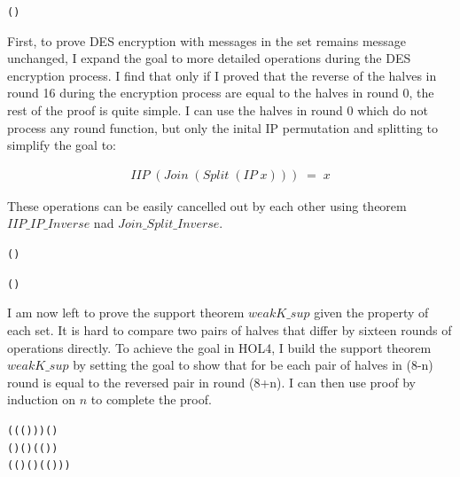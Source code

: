 \documentclass{article}
\begin{document}
\begin{alltt}
   \HOLTokenTurnstile{}  \HOLSymConst{\HOLTokenIn{}}  \HOLSymConst{\HOLTokenConj{}}   \HOLSymConst{=} (\HOLSymConst{,}) \HOLSymConst{\HOLTokenImp{}}
     \HOLSymConst{=} 
\end{alltt}

First, to prove DES encryption with messages in the set remains message unchanged, I expand the goal to more detailed operations
during the DES encryption process. I find that only
if I proved that the reverse of the halves in round 16 during the encryption process are equal to the halves in round 0,
the rest of the proof is
quite simple. I can use the halves in round 0 which do not process any round function, but only the inital IP permutation
and splitting to simplify the goal to:

\begin{multline}
 IIP \; (Join \; (Split \; (IP \; x))) \; = \; x
\end{multline}

These operations can be easily cancelled out by each other using theorem $IIP\_IP\_Inverse$ nad $Join\_Split\_Inverse$.

\begin{alltt}
   \HOLTokenTurnstile{}  ( ) \HOLSymConst{=} 
\end{alltt}

\begin{alltt}
   \HOLTokenTurnstile{}  ( ) \HOLSymConst{=} 
\end{alltt}

I am now left to prove the support theorem $weakK\_sup$ given the property of each set. It is hard to compare two pairs of
halves that differ by sixteen rounds of operations directly. To achieve the goal in HOL4, I build the support theorem
$weakK\_sup$ by setting the goal to show that for be each pair of halves in (8-n) round is equal to the reversed pair
in round (8+n). I can then use proof by induction on $n$ to complete the proof.

\begin{alltt}
   \HOLTokenTurnstile{}    \HOLSymConst{\HOLTokenConj{}}  \HOLSymConst{\HOLTokenLeq{}}  \HOLSymConst{\HOLTokenConj{}}  \HOLSymConst{\HOLTokenLeq{}}  \HOLSymConst{\HOLTokenConj{}}
    ( (  (  ) )) \HOLSymConst{=} (\HOLSymConst{,}) \HOLSymConst{\HOLTokenImp{}}
    ( \HOLSymConst{\ensuremath{-}} ) (  ) ( ( )) \HOLSymConst{=}
    ( ( \HOLSymConst{\ensuremath{+}} ) (  ) ( ( )))
\end{alltt}
\end{document}
